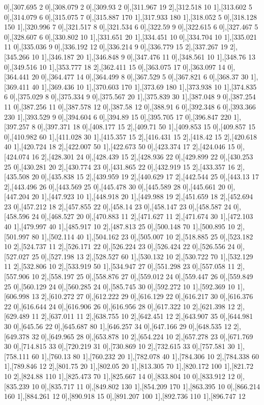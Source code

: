 {0],[307.695 2 0],[308.079 2 0],[309.93 2 0],[311.967 19 2],[312.518 10 1],[313.602 5 0],[314.079 6 0],[315.075 7 0],[315.887 170 1],[317.933 180 1],[318.052 5 0],[318.128 150 1],[320.996 7 0],[321.517 8 0],[321.534 6 0],[322.59 9 0],[322.615 6 0],[327.467 5 0],[328.607 6 0],[330.802 10 1],[331.651 20 1],[334.451 10 0],[334.704 10 1],[335.021 11 0],[335.036 9 0],[336.192 12 0],[336.214 9 0],[336.779 15 2],[337.267 19 2],[345.266 10 1],[346.187 20 1],[346.848 9 0],[347.476 11 0],[348.561 10 1],[348.76 13 0],[349.516 10 1],[353.777 18 2],[362.411 15 0],[363.075 17 0],[363.097 14 0],[364.441 20 0],[364.477 14 0],[364.499 8 0],[367.529 5 0],[367.821 6 0],[368.37 30 1],[369.411 40 1],[369.436 10 1],[370.603 170 1],[373.69 180 1],[373.938 10 1],[374.835 6 0],[375.029 8 0],[375.334 9 0],[375.567 20 1],[375.839 30 1],[387.048 9 0],[387.254 11 0],[387.256 11 0],[387.578 12 0],[387.58 12 0],[388.91 6 0],[392.348 6 0],[393.366 230 1],[393.529 9 0],[394.604 6 0],[394.89 15 0],[395.705 17 0],[396.847 220 1],[397.257 8 0],[397.371 18 0],[408.177 15 2],[409.71 50 1],[409.853 15 0],[409.857 15 0],[410.982 60 1],[411.028 30 1],[415.357 15 2],[416.431 15 2],[418.42 15 2],[420.618 40 1],[420.724 18 2],[422.007 50 1],[422.673 50 0],[423.374 17 2],[424.046 15 0],[424.074 16 2],[428.301 24 0],[428.439 15 2],[428.936 22 0],[429.899 22 0],[430.253 25 0],[430.281 20 2],[430.774 23 0],[431.865 22 0],[432.919 15 2],[433.357 16 2],[435.508 20 0],[435.838 15 2],[439.959 19 2],[440.629 17 2],[442.544 25 0],[443.13 17 2],[443.496 26 0],[443.569 25 0],[445.478 30 0],[445.589 28 0],[445.661 20 0],[447.204 20 1],[447.923 10 1],[448.918 20 1],[449.988 19 2],[451.659 18 2],[452.694 23 0],[457.212 18 2],[457.855 22 0],[458.14 23 0],[458.147 23 0],[458.587 24 0],[458.596 24 0],[468.527 20 0],[470.883 11 2],[471.627 11 2],[471.674 30 1],[472.103 40 1],[479.997 40 1],[485.917 10 2],[487.813 25 0],[500.148 70 1],[500.895 10 2],[501.997 80 1],[502.114 40 1],[504.162 23 0],[505.007 10 2],[518.885 25 0],[523.182 10 2],[524.737 11 2],[526.171 22 0],[526.224 23 0],[526.424 22 0],[526.556 24 0],[527.027 25 0],[527.198 13 2],[528.527 60 1],[530.132 10 2],[530.722 70 1],[532.129 11 2],[532.806 10 2],[533.919 50 1],[534.947 27 0],[551.298 23 0],[557.058 11 2],[557.906 10 2],[558.197 25 0],[558.876 27 0],[559.012 24 0],[559.447 26 0],[559.849 25 0],[560.129 24 0],[560.285 24 0],[585.745 30 0],[592.272 10 1],[592.369 10 1],[606.998 13 2],[610.272 27 0],[612.222 29 0],[616.129 22 0],[616.217 30 0],[616.376 22 0],[616.644 24 0],[616.906 26 0],[616.956 28 0],[617.322 10 2],[621.398 12 2],[629.489 11 2],[637.011 11 2],[638.755 10 2],[642.451 12 2],[643.907 35 0],[644.981 30 0],[645.56 22 0],[645.687 80 1],[646.257 34 0],[647.166 29 0],[648.535 12 2],[649.378 32 0],[649.965 28 0],[653.878 10 2],[654.224 10 2],[657.278 23 0],[671.769 30 0],[714.815 33 0],[720.219 31 0],[730.869 10 2],[732.615 33 0],[757.581 30 1],[758.111 60 1],[760.13 80 1],[760.232 20 1],[782.078 40 1],[784.306 10 2],[784.338 60 1],[789.846 12 2],[801.75 20 1],[802.05 20 1],[813.305 70 1],[820.172 100 1],[821.72 10 2],[824.88 110 1],[825.473 70 1],[825.667 14 0],[833.804 10 0],[833.912 12 0],[835.239 10 0],[835.717 11 0],[849.802 130 1],[854.209 170 1],[863.395 10 0],[866.214 160 1],[884.261 12 0],[890.918 15 0],[891.207 100 1],[892.736 110 1],[896.747 12 }
